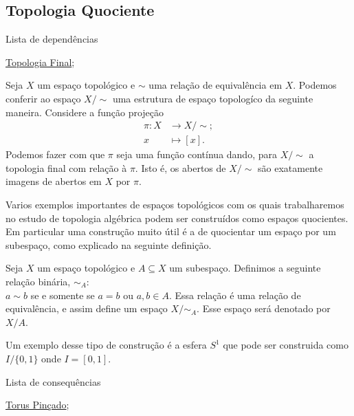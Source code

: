 \subsection{Topologia Quociente}
\label{topologia-quociente-def}
\begin{titlemize}{Lista de dependências}
	\item \hyperref[topologia-final]{Topologia Final}; 
\end{titlemize}
\begin{defi}
	Seja \(X\) um espaço topológico e \(\sim\) uma relação de equivalência em \(X\).
	Podemos conferir ao espaço \(X/\sim\) uma estrutura de espaço topologíco da seguinte maneira. Considere a função projeção
	\begin{align*}
		\pi:X&\to X/\sim;\\
		x&\mapsto [x].
	\end{align*}
	Podemos fazer com que \(\pi\) seja uma função contínua dando, para \(X/\sim\) a topologia final com relação à \(\pi\). Isto é, os abertos de \(X/\sim\) são exatamente imagens de abertos em \(X\) por \(\pi\).  
\end{defi}
Varios exemplos importantes de espaços topológicos com os quais trabalharemos no estudo de topologia algébrica podem ser construídos como espaços quocientes. Em particular uma construção muito útil é a de quocientar um espaço por um subespaço, como explicado na seguinte definição.
\begin{defi}
	Seja \(X\) um espaço topológico e \(A \subseteq X\) um subespaço. Definimos a seguinte relação binária, \(\sim_{A}\):\\
	\(a\sim b\) se e somente se \(a=b\) ou \(a,b\in A\). Essa relação é uma relação de equivalência, e assim define um espaço \(X/\sim_A\). Esse espaço será denotado por \(X/A\). 
\end{defi}
Um exemplo desse tipo de construção é a esfera \(S^1\) que pode ser construida como \(I/\{0,1\}\) onde \(I=[0,1]\). 
\begin{titlemize}{Lista de consequências}
	\item \hyperref[pinched-torus-ex]{Torus Pinçado};
\end{titlemize}



